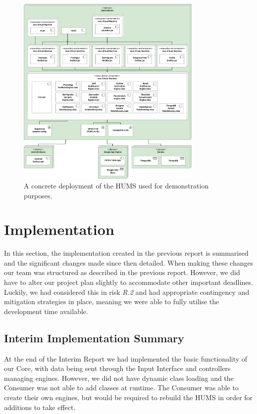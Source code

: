 \documentclass[10pt,a4paper]{article}
\begin{document}
\begin{figure}[ht]
  \centering
  \includegraphics[width=0.8\textwidth]{images/Demo.png}
  \caption{A concrete deployment of the HUMS used for demonstration purposes.}
  \label{fig:deploydemo}
\end{figure}


\section{Implementation}
\label{sec:dev}
In this section, the implementation created in the previous report is summarised and the significant changes made since then detailed. When making these changes our team was structured as described in the previous report. However, we did have to alter our project plan slightly to accommodate other important deadlines. Luckily, we had considered this in risk \emph{R.2} and had appropriate contingency and mitigation strategies in place, meaning we were able to fully utilise the development time available. 

\subsection{Interim Implementation Summary}
\label{sec:interim_summary}
At the end of the Interim Report we had implemented the basic functionality of our Core, with data being sent through the Input Interface and controllers managing engines. However, we did not have dynamic class loading and the Consumer was not able to add classes at runtime. The Consumer was able to create their own engines, but would be required to rebuild the HUMS in order for additions to take effect.
\end{document}
